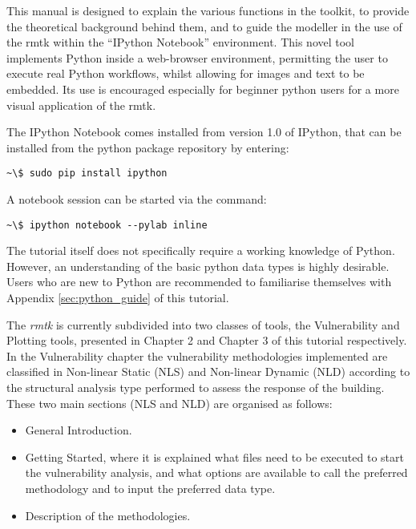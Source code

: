 This manual is designed to explain the various functions in the toolkit, to provide the theoretical background behind them, and to guide the modeller in the use of the rmtk within the ``IPython Notebook'' environment. This novel tool implements Python inside a web-browser environment, permitting the user to execute real Python workflows, whilst allowing for images and text to be embedded. Its use is encouraged especially for beginner python users for a more visual application of the rmtk.

The IPython Notebook  comes installed from version 1.0 of IPython, that can be installed from the python package repository by entering: 

\begin{Verbatim}[frame=single, commandchars=\\\{\}, samepage=true]
~\$ sudo pip install ipython
\end{Verbatim}

A notebook session can be started via the command:

\begin{Verbatim}[frame=single, commandchars=\\\{\}, samepage=true]
~\$ ipython notebook --pylab inline
\end{Verbatim}

The tutorial itself does not specifically require a working knowledge of Python. However, an understanding of the basic python data types is highly desirable. Users who are new to Python are recommended to familiarise themselves with Appendix \ref{sec:python_guide} of this tutorial. 

The \textit{rmtk} is currently subdivided into two classes of tools, the Vulnerability and Plotting tools, presented in Chapter 2 and Chapter 3 of this tutorial respectively. In the Vulnerability chapter the vulnerability methodologies implemented are classified in Non-linear Static (NLS) and Non-linear Dynamic (NLD) according to the structural analysis type performed to assess the response of the building. These two main sections (NLS and NLD) are organised as follows:

\begin{itemize}
\item General Introduction.
\item Getting Started, where it is explained what files need to be executed to start the vulnerability analysis, and what options are available to call the preferred methodology and to input the preferred data type.
\item Description of the methodologies.
\end{itemize}


